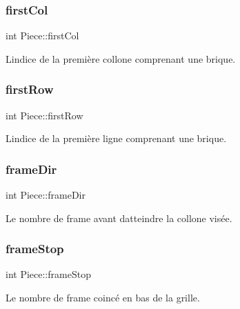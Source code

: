 \subsubsection{\texorpdfstring{first\+Col}{firstCol}}
{\footnotesize\ttfamily int Piece\+::first\+Col}



L\textquotesingle{}indice de la première collone comprenant une brique. 

\mbox{\label{struct_piece_aa7a294ad71a4c69d0b0b83f5abafe066}} 
\subsubsection{\texorpdfstring{first\+Row}{firstRow}}
{\footnotesize\ttfamily int Piece\+::first\+Row}



L\textquotesingle{}indice de la première ligne comprenant une brique. 

\mbox{\label{struct_piece_ac5dd791052ddb644af6904fe7bbf86d8}} 
\subsubsection{\texorpdfstring{frame\+Dir}{frameDir}}
{\footnotesize\ttfamily int Piece\+::frame\+Dir}



Le nombre de frame avant d\textquotesingle{}atteindre la collone visée. 

\mbox{\label{struct_piece_a267d24f36baede2610b872e7e910ac29}} 
\subsubsection{\texorpdfstring{frame\+Stop}{frameStop}}
{\footnotesize\ttfamily int Piece\+::frame\+Stop}



Le nombre de frame coincé en bas de la grille. 

\mbox{\label{struct_piece_afab34d8939b7959fc2a95b4f05c38bbd}} 
